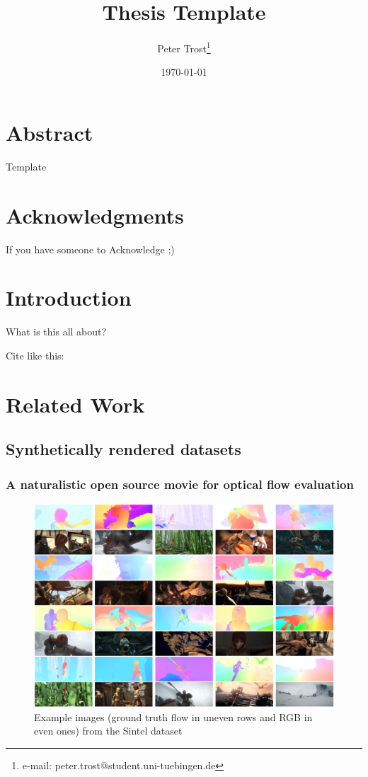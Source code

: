 \documentclass[a4paper,cleardoubleempty,BCOR1cm]{scrbook}
\title{Thesis Template}
\author{Peter Trost\thanks{e-mail: peter.trost@student.uni-tuebingen.de}}
\date{\today}
\begin{document}


\chapter*{Abstract}
Template

\chapter*{Acknowledgments}
If you have someone to Acknowledge ;)

\tableofcontents


\chapter{Introduction}
What is this all about?

Cite like this: \cite{agarwal2011}

\chapter{Related Work}
\section{Synthetically rendered datasets}
\subsection{A naturalistic open source movie for optical flow evaluation}
\cite{Butler:ECCV:2012}

\begin{figure}[h]
	\centering
	\includegraphics[width=\textwidth]{images/sintel_images.png}
	\caption{Example images (ground truth flow in uneven rows and RGB in even ones) from the Sintel dataset}
	\label{Sintel}
\end{figure}
\end{document}
